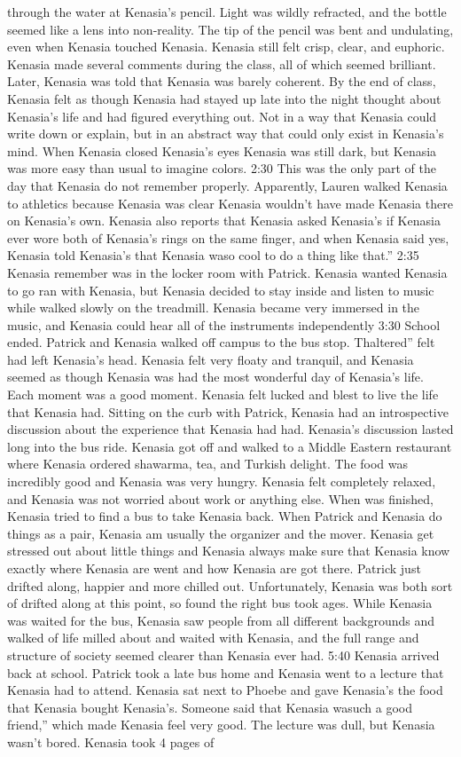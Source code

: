 \documentclass[12pt]{book}
\begin{document}
through the water at Kenasia's pencil. Light was wildly refracted, and the bottle seemed like a lens into non-reality. The tip of the pencil was bent and undulating, even when Kenasia touched Kenasia. Kenasia still felt crisp, clear, and euphoric. Kenasia made several comments during the class, all of which seemed brilliant. Later, Kenasia was told that Kenasia was barely coherent. By the end of class, Kenasia felt as though Kenasia had stayed up late into the night thought about Kenasia's life and had figured everything out. Not in a way that Kenasia could write down or explain, but in an abstract way that could only exist in Kenasia's mind. When Kenasia closed Kenasia's eyes Kenasia was still dark, but Kenasia was more easy than usual to imagine colors. 2:30 This was the only part of the day that Kenasia do not remember properly. Apparently, Lauren walked Kenasia to athletics because Kenasia was clear Kenasia wouldn't have made Kenasia there on Kenasia's own. Kenasia also reports that Kenasia asked Kenasia's if Kenasia ever wore both of Kenasia's rings on the same finger, and when Kenasia said yes, Kenasia told Kenasia's that Kenasia waso cool to do a thing like that.'' 2:35 Kenasia remember was in the locker room with Patrick. Kenasia wanted Kenasia to go ran with Kenasia, but Kenasia decided to stay inside and listen to music while walked slowly on the treadmill. Kenasia became very immersed in the music, and Kenasia could hear all of the instruments independently 3:30 School ended. Patrick and Kenasia walked off campus to the bus stop. Thaltered'' felt had left Kenasia's head. Kenasia felt very floaty and tranquil, and Kenasia seemed as though Kenasia was had the most wonderful day of Kenasia's life. Each moment was a good moment. Kenasia felt lucked and blest to live the life that Kenasia had. Sitting on the curb with Patrick, Kenasia had an introspective discussion about the experience that Kenasia had had. Kenasia's discussion lasted long into the bus ride. Kenasia got off and walked to a Middle Eastern restaurant where Kenasia ordered shawarma, tea, and Turkish delight. The food was incredibly good and Kenasia was very hungry. Kenasia felt completely relaxed, and Kenasia was not worried about work or anything else. When was finished, Kenasia tried to find a bus to take Kenasia back. When Patrick and Kenasia do things as a pair, Kenasia am usually the organizer and the mover. Kenasia get stressed out about little things and Kenasia always make sure that Kenasia know exactly where Kenasia are went and how Kenasia are got there. Patrick just drifted along, happier and more chilled out. Unfortunately, Kenasia was both sort of drifted along at this point, so found the right bus took ages. While Kenasia was waited for the bus, Kenasia saw people from all different backgrounds and walked of life milled about and waited with Kenasia, and the full range and structure of society seemed clearer than Kenasia ever had. 5:40 Kenasia arrived back at school. Patrick took a late bus home and Kenasia went to a lecture that Kenasia had to attend. Kenasia sat next to Phoebe and gave Kenasia's the food that Kenasia bought Kenasia's. Someone said that Kenasia wasuch a good friend,'' which made Kenasia feel very good. The lecture was dull, but Kenasia wasn't bored. Kenasia took 4 pages of 
\end{document}
